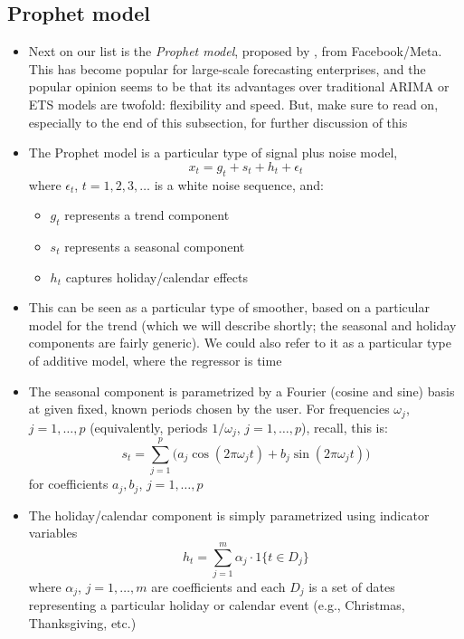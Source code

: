 \documentclass{article}
\begin{document}
\subsection{Prophet model}

\begin{itemize}
\item Next on our list is the \emph{Prophet model}, proposed by
  \citet{taylor2018forecasting}, from Facebook/Meta. This has become popular for 
  large-scale forecasting enterprises, and the popular opinion seems to be that
  its advantages over traditional ARIMA or ETS models are twofold: flexibility
  and speed. But, make sure to read on, especially to the end of this
  subsection, for further discussion of this  

\item The Prophet model is a particular type of signal plus noise model, 
  \[
  x_t = g_t + s_t + h_t + \epsilon_t
  \]
  where $\epsilon_t$, $t = 1,2,3,\dots$ is a white noise sequence, and:
  \begin{itemize}
  \item $g_t$ represents a trend component
  \item $s_t$ represents a seasonal component
  \item $h_t$ captures holiday/calendar effects 
  \end{itemize}

\item This can be seen as a particular type of smoother, based on a particular
  model for the trend (which we will describe shortly; the seasonal and holiday
  components are fairly generic). We could also refer to it as a particular type
  of additive model, where the regressor is time

\item The seasonal component is parametrized by a Fourier (cosine and sine)
  basis at given fixed, known periods chosen by the user. For frequencies
  $\omega_j$, $j = 1,\dots,p$ (equivalently, periods $1/\omega_j$, $j =
  1,\dots,p$), recall, this is:  
  \[
  s_t = \sum_{j=1}^p \Big( a_j \cos(2\pi \omega_j t) + b_j \sin(2\pi \omega_j t)
  \Big) 
  \]
  for coefficients $a_j, b_j$, $j = 1,\dots,p$

\item The holiday/calendar component is simply parametrized using indicator
  variables 
  \[
  h_t = \sum_{j=1}^m \alpha_j \cdot 1\{ t \in D_j \}
  \]
  where $\alpha_j$, $j = 1,\dots,m$ are coefficients and each $D_j$ is a set of
  dates representing a particular holiday or calendar event (e.g., Christmas,
  Thanksgiving, etc.) 


\end{itemize}
\end{document}
